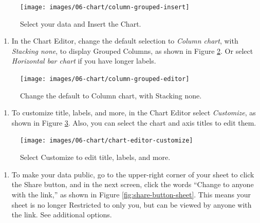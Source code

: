 \documentclass[
  english,
]{book}
\providecommand{\tightlist}{%
  \setlength{\itemsep}{0pt}\setlength{\parskip}{0pt}}
\begin{document}
\begin{figure}
\texttt{[image: images/06-chart/column-grouped-insert]} \caption{Select your data and Insert the Chart.}\label{fig:column-grouped-insert}
\end{figure}

\begin{enumerate}
\def\labelenumi{\arabic{enumi}.}
\setcounter{enumi}{4}
\tightlist
\item
  In the Chart Editor, change the default selection to \emph{Column chart}, with \emph{Stacking none}, to display Grouped Columns, as shown in Figure \ref{fig:column-grouped-editor}. Or select \emph{Horizontal bar chart} if you have longer labels.
\end{enumerate}



\begin{figure}
\texttt{[image: images/06-chart/column-grouped-editor]} \caption{Change the default to Column chart, with Stacking none.}\label{fig:column-grouped-editor}
\end{figure}

\begin{enumerate}
\def\labelenumi{\arabic{enumi}.}
\setcounter{enumi}{5}
\tightlist
\item
  To customize title, labels, and more, in the Chart Editor select \emph{Customize}, as shown in Figure \ref{fig:chart-editor-customize}. Also, you can select the chart and axis titles to edit them.
\end{enumerate}



\begin{figure}
\texttt{[image: images/06-chart/chart-editor-customize]} \caption{Select Customize to edit title, labels, and more.}\label{fig:chart-editor-customize}
\end{figure}

\begin{enumerate}
\def\labelenumi{\arabic{enumi}.}
\setcounter{enumi}{6}
\tightlist
\item
  To make your data public, go to the upper-right corner of your sheet to click the Share button, and in the next screen, click the words ``Change to anyone with the link,'' as shown in Figure \ref{fig:share-button-sheet}. This means your sheet is no longer Restricted to only you, but can be viewed by anyone with the link. See additional options.
\end{enumerate}
\end{document}
